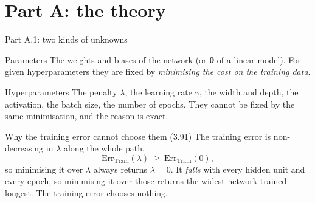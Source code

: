 \documentclass[10pt,aspectratio=169]{beamer}
\begin{document}
\section{Part A: the theory}
\begin{frame}{Part A.1: two kinds of unknowns}
\small
\begin{block}{Parameters}
The weights and biases of the network (or $\bm{\theta}$ of a linear
model).  For given hyperparameters they are fixed by \emph{minimising the
cost on the training data}.
\end{block}
\begin{block}{Hyperparameters}
The penalty $\lambda$, the learning rate $\gamma$, the width and depth,
the activation, the batch size, the number of epochs.  They cannot be
fixed by the same minimisation, and the reason is exact.
\end{block}
\begin{block}{Why the training error cannot choose them (3.91)}
The training error is non-decreasing in $\lambda$ along the whole path,
\[
  \mathrm{Err}_{\mathrm{Train}}(\lambda)\ \ge\ \mathrm{Err}_{\mathrm{Train}}(0),
\]
so minimising it over $\lambda$ always returns $\lambda=0$.  It
\emph{falls} with every hidden unit and every epoch, so minimising it over
those returns the widest network trained longest.  The training error
chooses nothing.
\end{block}
\end{frame}
\end{document}

